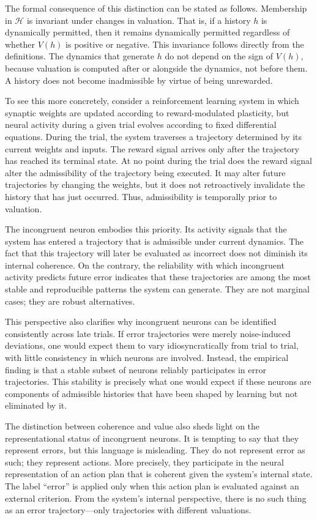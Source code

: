 \documentclass[11pt]{article}
\newcommand{\histories}{\mathcal{H}}
\newcommand{\valuation}{V}
\begin{document}
The formal consequence of this distinction can be stated as follows. Membership in $\histories$ is invariant under changes in valuation. That is, if a history $h$ is dynamically permitted, then it remains dynamically permitted regardless of whether $\valuation(h)$ is positive or negative. This invariance follows directly from the definitions. The dynamics that generate $h$ do not depend on the sign of $\valuation(h)$, because valuation is computed after or alongside the dynamics, not before them. A history does not become inadmissible by virtue of being unrewarded.

To see this more concretely, consider a reinforcement learning system in which synaptic weights are updated according to reward-modulated plasticity, but neural activity during a given trial evolves according to fixed differential equations. During the trial, the system traverses a trajectory determined by its current weights and inputs. The reward signal arrives only after the trajectory has reached its terminal state. At no point during the trial does the reward signal alter the admissibility of the trajectory being executed. It may alter future trajectories by changing the weights, but it does not retroactively invalidate the history that has just occurred. Thus, admissibility is temporally prior to valuation.

The incongruent neuron embodies this priority. Its activity signals that the system has entered a trajectory that is admissible under current dynamics. The fact that this trajectory will later be evaluated as incorrect does not diminish its internal coherence. On the contrary, the reliability with which incongruent activity predicts future error indicates that these trajectories are among the most stable and reproducible patterns the system can generate. They are not marginal cases; they are robust alternatives.

This perspective also clarifies why incongruent neurons can be identified consistently across late trials. If error trajectories were merely noise-induced deviations, one would expect them to vary idiosyncratically from trial to trial, with little consistency in which neurons are involved. Instead, the empirical finding is that a stable subset of neurons reliably participates in error trajectories. This stability is precisely what one would expect if these neurons are components of admissible histories that have been shaped by learning but not eliminated by it.

The distinction between coherence and value also sheds light on the representational status of incongruent neurons. It is tempting to say that they represent errors, but this language is misleading. They do not represent error as such; they represent actions. More precisely, they participate in the neural representation of an action plan that is coherent given the system’s internal state. The label “error” is applied only when this action plan is evaluated against an external criterion. From the system’s internal perspective, there is no such thing as an error trajectory—only trajectories with different valuations.
\end{document}
